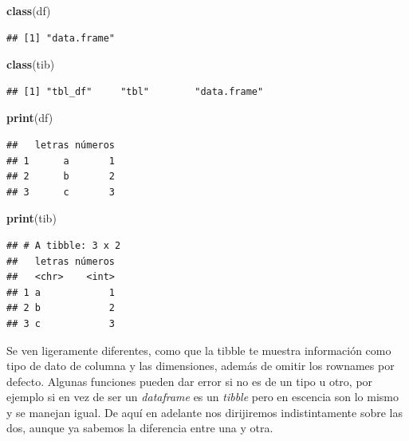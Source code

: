 \documentclass[
]{book}
\newenvironment{Shaded}{\begin{snugshade}}{\end{snugshade}}
\newcommand{\FunctionTok}[1]{\textcolor[rgb]{0.13,0.29,0.53}{\textbf{#1}}}
\newcommand{\NormalTok}[1]{#1}
\begin{document}
\hfill\break

\begin{Shaded}
\begin{Highlighting}[]
\FunctionTok{class}\NormalTok{(df)}
\end{Highlighting}
\end{Shaded}

\begin{verbatim}
## [1] "data.frame"
\end{verbatim}

\begin{Shaded}
\begin{Highlighting}[]
\FunctionTok{class}\NormalTok{(tib)}
\end{Highlighting}
\end{Shaded}

\begin{verbatim}
## [1] "tbl_df"     "tbl"        "data.frame"
\end{verbatim}

\hfill\break

\begin{Shaded}
\begin{Highlighting}[]
\FunctionTok{print}\NormalTok{(df)}
\end{Highlighting}
\end{Shaded}

\begin{verbatim}
##   letras números
## 1      a       1
## 2      b       2
## 3      c       3
\end{verbatim}

\begin{Shaded}
\begin{Highlighting}[]
\FunctionTok{print}\NormalTok{(tib)}
\end{Highlighting}
\end{Shaded}

\begin{verbatim}
## # A tibble: 3 x 2
##   letras números
##   <chr>    <int>
## 1 a            1
## 2 b            2
## 3 c            3
\end{verbatim}

Se ven ligeramente diferentes, como que la tibble te muestra información como tipo de dato de columna y las dimensiones, además de omitir los rownames por defecto.
Algunas funciones pueden dar error si no es de un tipo u otro, por ejemplo si en vez de ser un \emph{dataframe} es un \emph{tibble} pero en escencia son lo mismo y se manejan igual.
De aquí en adelante nos dirijiremos indistintamente sobre las dos, aunque ya sabemos la diferencia entre una y otra.
\end{document}
